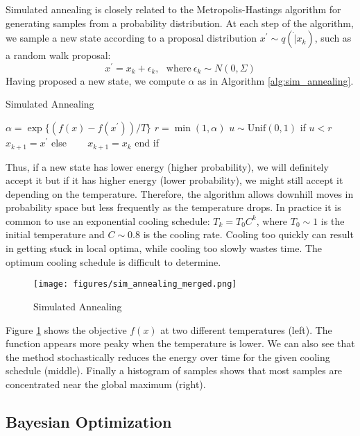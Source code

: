 Simulated annealing is closely related to the Metropolis-Hastings algorithm for generating samples from a probability distribution. At each step of the algorithm, we sample a new state according to a proposal distribution $x^{\prime} \sim q(\dot|x_k)$, such as a random walk proposal:
\begin{equation}
    x^{\prime} = x_k + \epsilon_k, ~~~ \mathrm{where}~ \epsilon_k \sim N(0,\Sigma)
\end{equation}
Having proposed a new state, we compute $\alpha$ as in Algorithm \ref{alg:sim_annealing}.
\begin{algorithm}
\caption{Simulated Annealing}
\label{alg:sim_annealing}
\begin{algorithmic}[1]
\STATE $\alpha = \exp\{(f(x)-f(x^{\prime}))/T\}$
\STATE $r = \min(1,\alpha)$
\STATE $u \sim \mathrm{Unif}(0,1)$
\STATE if $u < r$ 
\STATE ~~~ $x_{k+1} = x^{\prime}$
\STATE else
\STATE ~~~ $x_{k+1} = x_k$
\STATE end if  
\end{algorithmic}
\end{algorithm}
Thus, if a new state has lower energy (higher probability), we will definitely accept it but if it has higher energy (lower probability), we might still accept it depending on the temperature. Therefore, the algorithm allows downhill moves in probability space but less frequently as the temperature drops. In practice it is common to use an exponential cooling schedule: $T_k = T_0 C^{k}$, where $T_0 \sim 1$ is the initial temperature and $C \sim 0.8$ is the cooling rate. Cooling too quickly can result in getting stuck in local optima, while cooling too slowly wastes time. The optimum cooling schedule is difficult to determine.    

\begin{figure}[tbhp]
    \centering
    \texttt{[image: figures/sim\_annealing\_merged.png]}
    \caption{Simulated Annealing}
    \label{fig:sim_annealing_merged}
\end{figure}

Figure \ref{fig:sim_annealing_merged} shows the objective $f(x)$ at two different temperatures (left). The function appears more peaky when the temperature is lower. We can also see that the method stochastically reduces the energy over time for the given cooling schedule (middle). Finally a histogram of samples shows that most samples are concentrated near the global maximum (right).


\subsection{Bayesian Optimization}

